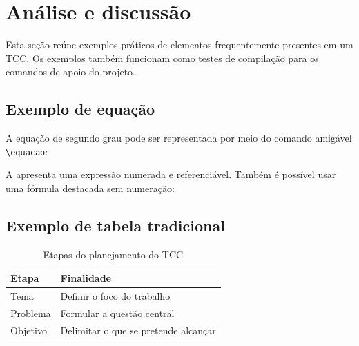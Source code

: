 %
%
%
%
%

\chapter{Análise e discussão}

Esta seção reúne exemplos práticos de elementos frequentemente presentes em um TCC. Os exemplos também funcionam como testes de compilação para os comandos de apoio do projeto.

\section{Exemplo de equação}

A equação de segundo grau pode ser representada por meio do comando amigável \verb|\equacao|:

A  apresenta uma expressão numerada e referenciável. Também é possível usar uma fórmula destacada sem numeração:

\section{Exemplo de tabela tradicional}

\begin{table}[htbp]
	\centering
	\caption{Etapas do planejamento do TCC}
	\label{tab:planejamento-tcc}
	\begin{tabular}{p{} p{}}
		\hline
		\textbf{Etapa} & \textbf{Finalidade} \\
		\hline
		Tema & Definir o foco do trabalho \\
		Problema & Formular a questão central \\
		Objetivo & Delimitar o que se pretende alcançar \\
		\hline
	\end{tabular}
\end{table}

